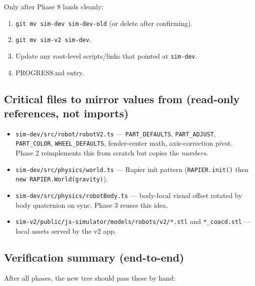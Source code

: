 \documentclass[
]{article}
\providecommand{\tightlist}{%
  \setlength{\itemsep}{0pt}\setlength{\parskip}{0pt}}
\begin{document}
Only after Phase 8 lands cleanly:

\begin{enumerate}
\def\labelenumi{\arabic{enumi}.}
\tightlist
\item
  \texttt{git\ mv\ sim-dev\ sim-dev-old} (or delete after confirming).
\item
  \texttt{git\ mv\ sim-v2\ sim-dev}.
\item
  Update any root-level scripts/links that pointed at \texttt{sim-dev}.
\item
  PROGRESS.md entry.
\end{enumerate}

\subsection{Critical files to mirror values from (read-only references,
not
imports)}\label{critical-files-to-mirror-values-from-read-only-references-not-imports}

\begin{itemize}
\tightlist
\item
  \texttt{sim-dev/src/robot/robotV2.ts} --- \texttt{PART\_DEFAULTS},
  \texttt{PART\_ADJUST}, \texttt{PART\_COLOR}, \texttt{WHEEL\_DEFAULTS},
  fender-center math, axis-correction pivot. Phase 2 reimplements this
  from scratch but copies the \emph{numbers}.
\item
  \texttt{sim-dev/src/physics/world.ts} --- Rapier init pattern
  (\texttt{RAPIER.init()} then \texttt{new\ RAPIER.World(gravity)}).
\item
  \texttt{sim-dev/src/physics/robotBody.ts} --- body-local visual offset
  rotated by body quaternion on sync. Phase 3 reuses this idea.
\item
  \texttt{sim-v2/public/js-simulator/models/robots/v2/*.stl} and
  \texttt{*\_coacd.stl} --- local assets served by the v2 app.
\end{itemize}

\subsection{Verification summary
(end-to-end)}\label{verification-summary-end-to-end}

After all phases, the new tree should pass these by hand:
\end{document}
